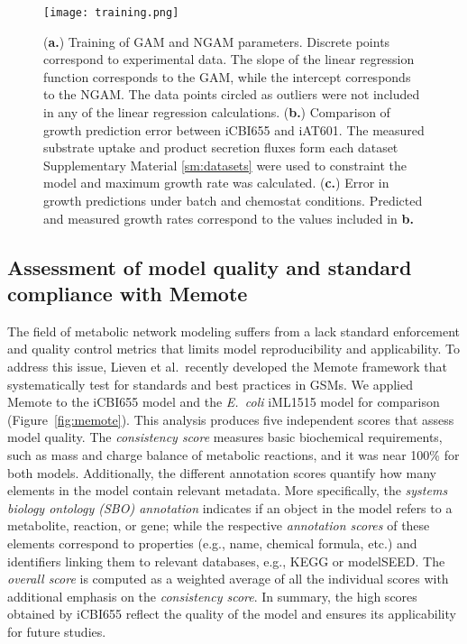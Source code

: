 \begin{figure}[h]
    \caption[Training of iCBI655 model]{(\textbf{a.}) Training of GAM and NGAM parameters. Discrete points correspond to experimental data. The slope of the linear regression function corresponds to the GAM, while the intercept corresponds to the NGAM. The data points circled as outliers were not included in any of the linear regression calculations. (\textbf{b.}) Comparison of growth prediction error between iCBI655 and iAT601. The measured substrate uptake and product secretion fluxes form each dataset Supplementary Material \ref{sm:datasets} were used to constraint the model and maximum growth rate was calculated.  (\textbf{c.}) Error in growth predictions under batch and chemostat conditions. Predicted and measured growth rates correspond to the values included in \textbf{b.}}
    \centering
    \texttt{[image: training.png]}
    \label{fig:training}
\end{figure}

\subsection{Assessment of model quality and standard compliance with Memote}
The field of metabolic network modeling suffers from a lack standard enforcement and quality control metrics that limits model reproducibility and applicability.
To address this issue, Lieven et al.\ recently developed the Memote framework that systematically test for standards and best practices in GSMs. \citep{lieven2018}
We applied Memote to the iCBI655 model and the \textit{E.~coli} iML1515 model for comparison (Figure~\ref{fig:memote}). This analysis produces five independent scores that assess model quality.
The \emph{consistency score}  measures basic biochemical requirements, such as mass and charge balance of metabolic reactions, and it was near 100\% for both models.
Additionally, the different annotation scores quantify how many elements in the model contain relevant metadata. More specifically, the \emph{systems biology ontology (SBO) annotation} indicates if an object in the model refers to a metabolite, reaction, or gene; while the respective \emph{annotation scores} of these elements correspond to properties (e.g., name, chemical formula, etc.) and identifiers linking them to relevant databases, e.g., KEGG\citep{kanehisa2000} or modelSEED.\citep{henry2010} The \emph{overall score} is computed as a weighted average of all the individual scores with additional emphasis on the \emph{consistency score}.
In summary, the high scores obtained by iCBI655 reflect the quality of the model and ensures its applicability for future studies.

